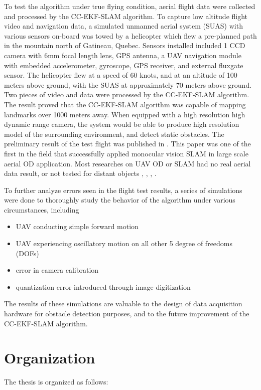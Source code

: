 To test the algorithm under true flying condition, aerial flight data
were collected and processed by the CC-EKF-SLAM algorithm. To capture
low altitude flight video and navigation data, a simulated unmanned
aerial system (SUAS) with various sensors on-board was towed by a
helicopter which flew a pre-planned path in the mountain north of
Gatineau, Quebec. Sensors installed included 1 CCD camera with 6mm
focal length lens, GPS antenna, a UAV navigation module with embedded
accelerometer, gyroscope, GPS receiver, and external fluxgate sensor.
The helicopter flew at a speed of 60 knots, and at an altitude of 100
meters above ground, with the SUAS at approximately 70 meters above
ground. Two pieces of video and data were processed by the CC-EKF-SLAM
algorithm. The result proved that the CC-EKF-SLAM algorithm was
capable of mapping landmarks over 1000 meters away. When equipped with
a high resolution high dynamic range camera, the system would be able
to produce high resolution model of the surrounding environment, and
detect static obstacles. The preliminary result of the test flight was
published in \cite{zhang_obstacle_2012}. This paper was one of the
first in the field that successfully applied monocular vision SLAM in
large scale aerial OD application. Most researches on UAV OD or SLAM
had no real aerial data result, or not tested for distant objects
\cite{lu_distance_2010}, \cite{Byrne_stereo_2006},
\cite{pinies_inertial_2007}, \cite{li_scene_2012}.

To further analyze errors seen in the flight test results, a series
of simulations were done to thoroughly study the behavior of the
algorithm under various circumstances, including
\begin{itemize}
\item UAV conducting simple forward motion
\item UAV experiencing oscillatory motion on all other 5 degree of
freedoms (DOFs)
\item error in camera calibration
\item quantization error introduced through image digitization 
\end{itemize}
The results of these simulations are valuable to the design of data
acquisition hardware for obstacle detection purposes, and to the future
improvement of the CC-EKF-SLAM algorithm.

\section{Organization}\label{section:Organization}
The thesis is organized as follows:

